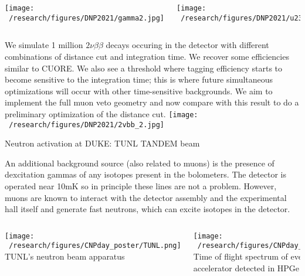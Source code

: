 \documentclass[final]{beamer}
\newlength{\colwidth}
\begin{document}
\begin{frame}[t]
\begin{columns}[t]
\begin{column}{\colwidth}
\begin{columns}[c]
        \column{.5\colwidth} %
        \texttt{[image: ~/research/figures/DNP2021/gamma2.jpg]}
        
        \column{.5\colwidth} %
        \texttt{[image: ~/research/figures/DNP2021/u238.jpg]}
      
      \end{columns}
      \vspace{1cm}

    We simulate 1 million $2\nu\beta\beta$ decays occuring in the detector with different combinations of distance cut and integration time. We recover some efficiencies similar to CUORE. We also see a threshold where tagging efficiency starts to become sensitive to the integration time; this is where future simultaneous optimizations will occur with other time-sensitive backgrounds. We aim to implement the full muon veto geometry and now compare with this result to do a preliminary optimization of the distance cut.
    \texttt{[image: ~/research/figures/DNP2021/2vbb\_2.jpg]}
  
  \begin{block}{Neutron activation at DUKE: TUNL TANDEM beam}

  \vspace{1cm}
  An additional background source (also related to muons) is the presence of dexcitation gammas of any isotopes present in the bolometers. The detector is operated near 10mK so in principle these lines are not a problem. However, muons are known to interact with the detector assembly and the experimental hall itself and generate fast neutrons, which can excite isotopes in the detector. 


  \begin{columns}[c] %
      
      \column{.5\colwidth} %
      \texttt{[image: ~/research/figures/CNPday\_poster/TUNL.png]}
      {\footnotesize TUNL's neutron beam apparatus}    
      
      \column{.5\colwidth} %
      \texttt{[image: ~/research/figures/CNPday\_poster/8MeV\_TOF.png]}
      {\footnotesize Time of flight spectrum of events from TANDEM accelerator detected in HPGe} 
  \end{columns}


\end{block}
\end{column}
\end{columns}
\end{frame}
\end{document}
